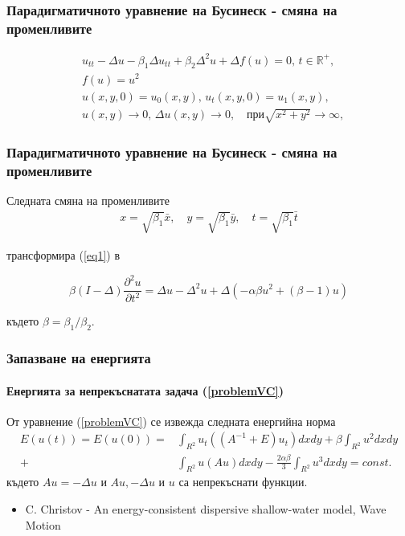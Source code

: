 \documentclass{beamer}
\newcommand{\be}{\begin{equation}}
\newcommand{\ee}{\end{equation}}
\newcommand{\rf}[1]{(\ref{#1})}
\newcommand{\RR}{\mathbb{R}}
\begin{document}
\begin{frame}
\frametitle{Парадигматичното уравнение на Бусинеск - смяна на променливите}

\begin{align}
&u_{tt} - \Delta u -\beta_1  \Delta u_{tt} +\beta_2 \Delta ^2 u + \Delta f(u)=0, \, t\in\RR^+,\label{eq1}
\\
&f(u) = u^2 \nonumber \\  \nonumber &u(x,y,0)=u_0(x,y), \, u_t(x,y,0)=u_1(x,y)  , 
\\  &u(x,y) \rightarrow 0, \,  \Delta u(x,y) \rightarrow 0 ,  \quad \text{при} \sqrt{x^2 + y^2} \rightarrow \infty, \label{eq11} 
\end{align}

\end{frame}


\begin{frame}
\frametitle{Парадигматичното уравнение на Бусинеск - смяна на променливите}
Следната смяна на променливите 
\begin{align}
x = \sqrt{\beta_1} \bar{x}, \quad y = \sqrt{\beta_1} \bar{y}, \quad t = \sqrt{\beta_1} \bar{t}
\end{align}

трансформира \rf{eq1} в

\be\label{problemVC}
\beta(I-\Delta) \frac{\partial^2 u}{\partial t^2}=
  \Delta u -\Delta^2 u +\Delta(-\alpha \beta u^2 + (\beta - 1 )u)
\ee

където $\beta = \beta_1/\beta_2$.

\end{frame}



\begin{frame}
\frametitle{Запазване на енергията}
\framesubtitle{Енергията за непрекъснатата задача \rf{problemVC}}
От уравнение \rf{problemVC} се извежда следната енергийна норма
\begin{align}\label{ex-en}
E(u(t)) = E(u(0)) =&\int_{R^2} u_t \left((A^{-1}+E)u_t\right) dxdy+
\beta \int_{R^2} u^2 dxdy \nonumber\\
+& \int_{R^2}u \left(A u\right) dxdy
-\frac{2 \alpha \beta}{3} \int_{R^2} u^3 dxdy =const.
\end{align}
където $Au=-\Delta u$ и $Au,-\Delta u$ и $u$ са непрекъснати функции.

\begin{itemize}
\item C. Christov - An energy-consistent dispersive shallow-water model, Wave Motion
\end{itemize}
\end{frame}
\end{document}

